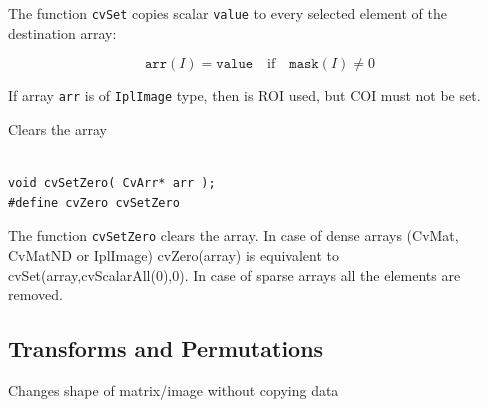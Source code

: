 \begin{description}
\end{description}


The function \texttt{cvSet} copies scalar \texttt{value} to every selected element of the destination array:

\[
\texttt{arr}(I)=\texttt{value} \quad \text{if} \quad \texttt{mask}(I) \ne 0
\]

If array \texttt{arr} is of \texttt{IplImage} type, then is ROI used, but COI must not be set.

\label{SetZero}

Clears the array

\begin{lstlisting}

void cvSetZero( CvArr* arr );
#define cvZero cvSetZero

\end{lstlisting}

\begin{description}
\end{description}

The function \texttt{cvSetZero} clears the array. In case of dense arrays (CvMat, CvMatND or IplImage) cvZero(array) is equivalent to
cvSet(array,cvScalarAll(0),0).
In case of sparse arrays all the elements are removed.

\subsection{Transforms and Permutations}

\label{Reshape}

Changes shape of matrix/image without copying data


\begin{description}
\end{description}

